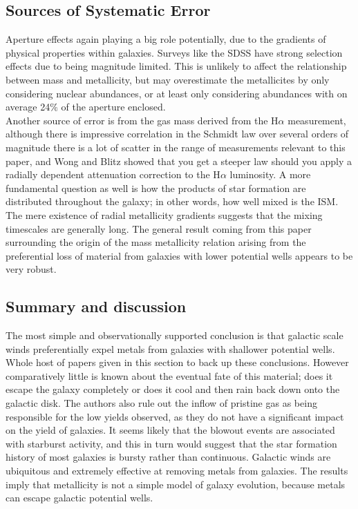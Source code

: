 \documentclass{literature}
\begin{document}
\subsection{Sources of Systematic Error}
Aperture effects again playing a big role potentially, due to the gradients of physical properties within galaxies. Surveys like the SDSS have strong selection effects due to being magnitude limited. This is unlikely to affect the relationship between mass and metallicity, but may overestimate the metallicites by only considering nuclear abundances, or at least only considering abundances with on average 24$\%$ of the aperture enclosed. \\ 
Another source of error is from the gas mass derived from the H$\alpha$ measurement, although there is impressive correlation in the Schmidt law over several orders of magnitude there is a lot of scatter in the range of measurements relevant to this paper, and Wong and Blitz \citep{Wong2002} showed that you get a steeper law should you apply a radially dependent attenuation correction to the H$\alpha$ luminosity. A more fundamental question as well is how the products of star formation are distributed throughout the galaxy; in other words, how well mixed is the ISM. The mere existence of radial metallicity gradients suggests that the mixing timescales are generally long. The general result coming from this paper surrounding the origin of the mass metallicity relation arising from the preferential loss of material from galaxies with lower potential wells appears to be very robust. 
\subsection{Summary and discussion}
The most simple and observationally supported conclusion is that galactic scale winds preferentially expel metals from galaxies with shallower potential wells. Whole host of papers given in this section to back up these conclusions. However comparatively little is known about the eventual fate of this material; does it escape the galaxy completely or does it cool and then rain back down onto the galactic disk. The authors also rule out the inflow of pristine gas as being responsible for the low yields observed, as they do not have a significant impact on the yield of galaxies. It seems likely that the blowout events are associated with starburst activity, and this in turn would suggest that the star formation history of most galaxies is bursty rather than continuous. Galactic winds are ubiquitous and extremely effective at removing metals from galaxies. The results imply that metallicity is not a simple model of galaxy evolution, because metals can escape galactic potential wells. 
\end{document}
